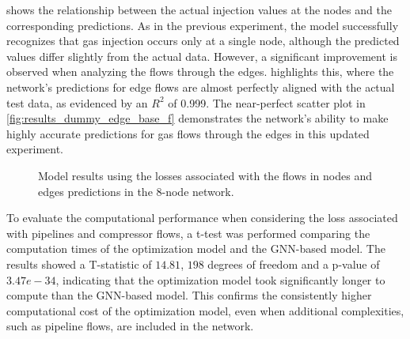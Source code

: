  shows the relationship between the actual injection values at the nodes and the corresponding predictions. As in the previous experiment, the model successfully recognizes that gas injection occurs only at a single node, although the predicted values differ slightly from the actual data. However, a significant improvement is observed when analyzing the flows through the edges.  highlights this, where the network's predictions for edge flows are almost perfectly aligned with the actual test data, as evidenced by an $R^2$ of 0.999. The near-perfect scatter plot in \cref{fig:results_dummy_edge_base_f} demonstrates the network's ability to make highly accurate predictions for gas flows through the edges in this updated experiment.



\begin{figure}
    \centering
        \setlength{}        
        \setlength{} 
        \caption{Model results using the losses associated with the flows in nodes and edges predictions in the 8-node network.}
        \label{fig:dummy_base_f_results}
\end{figure}


To evaluate the computational performance when considering the loss associated with pipelines and compressor flows, a t-test was performed comparing the computation times of the optimization model and the GNN-based model. The results showed a T-statistic of $14.81$, $198$ degrees of freedom and a p-value of $3.47e-34$, indicating that the optimization model took significantly longer to compute than the GNN-based model. This confirms the consistently higher computational cost of the optimization model, even when additional complexities, such as pipeline flows, are included in the network.



